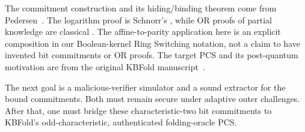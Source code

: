 \begin{remark}
The commitment construction and
its hiding/binding theorem come
from Pedersen~\cite{Pedersen1991}.
The logarithm proof is Schnorr's
\cite{Schnorr1991}, while OR
proofs of partial knowledge
are classical
\cite{CramerDamgardSchoenmakers1994}.
The affine-to-parity application
here is an explicit composition
in our Boolean-kernel
Ring Switching notation,
not a claim to have invented
bit commitments or OR proofs.
The target PCS and its
post-quantum motivation are
from the original KBFold
manuscript~\cite{MkhidaKBFold2026}.
\end{remark}

\begin{remark}
The next goal is a malicious-verifier
simulator and a sound extractor for
the bound commitments. Both must
remain secure under adaptive outer
challenges.
After that, one must bridge
these characteristic-two
bit commitments to KBFold's
odd-characteristic, authenticated
folding-oracle PCS.
\end{remark}
